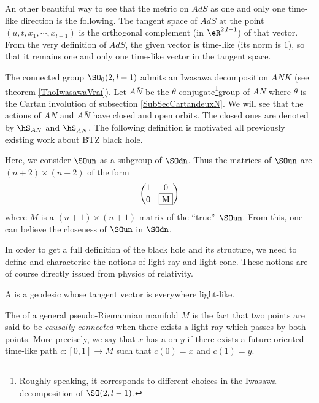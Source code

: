 An other beautiful way to see that the metric on $AdS$ as one and only one time-like direction is the following. The tangent space of $AdS$ at the point $(u,t,x_1,\cdots,x_{l-1})$ is the orthogonal complement (in $\eR^{2,l-1}$) of that vector. From the very definition of $AdS$, the given vector is time-like (its norm is $1$), so that it remains one and only one time-like vector in the tangent space.

The connected group $\SO_0(2,l-1)$ admits an Iwasawa decomposition $ANK$ (see theorem \ref{ThoIwasawaVrai}). Let $A\bar N$ be the $\theta$-conjugate\footnote{Roughly speaking, it corresponds to different choices in the Iwasawa decomposition of $\SO(2,l-1)$.}group of $AN$ where $\theta$ is the Cartan involution of subsection \ref{SubSecCartandeuxN}. We will see that the actions of $AN$ and $A\bar N$ have closed and open orbits. The closed ones are denoted by $\hS_{AN}$ and $\hS_{A\bar N}$. The following definition is motivated all previously existing work about BTZ black hole.

\begin{remark}
Here, we consider $\SOun$ as a subgroup of $\SOdn$. Thus the matrices of $\SOun$ are $(n+2)\times (n+2)$ of the form
\[
\begin{pmatrix}
   1 & 0\\
   0 & \fbox{M}
\end{pmatrix}
\]
where $M$ is a $(n+1)\times (n+1)$ matrix of the ``true''\ $\SOun$. From this, one can believe the closeness of $\SOun$ in $\SOdn$.
\end{remark}

In order to get a full definition of the black hole and its structure, we need to define and characterise the notions of light ray and light cone. These notions are of course directly issued from physics of relativity.  
\begin{definition}
A  is a geodesic whose tangent vector is everywhere light-like.
\label{lightraycone}
 \end{definition}

The  of a general pseudo-Riemannian manifold $M$ is the fact that two points are said to be \emph{causally connected} when there exists a light ray which passes by both points. More precisely, we say that $x$ has a  on $y$ if there exists a future oriented time-like path $c\colon [0,1]\to M$ such that $c(0)=x$ and $c(1)=y$.


